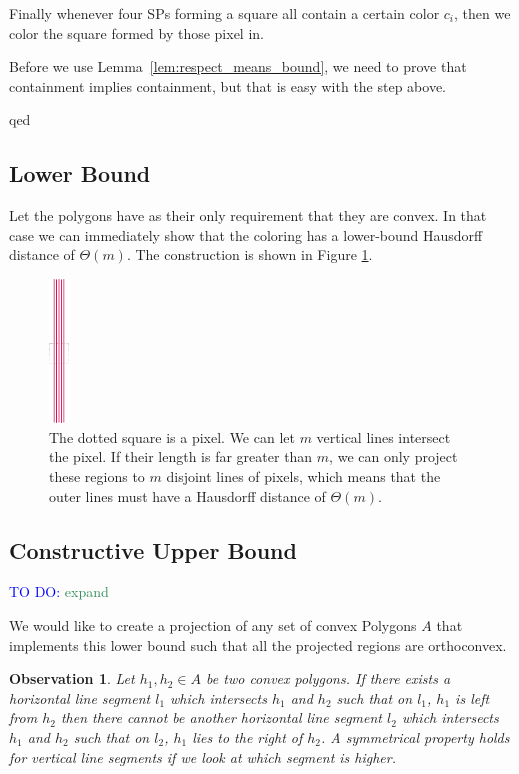 \documentclass[a4paper, UKenglish]{lipics-v2018}
\newtheorem{observation}{Observation}
\newcommand{\mremark}[3]{\textcolor{blue}{\textsc{#1 #2:}} \textcolor{SeaGreen}{\textsf{#3}}}
\newcommand{\todo}[2][DO]{\mremark{TO}{#1}{#2}}
\begin{document}
Finally whenever four SPs forming a square all contain a certain color $c_i$, then we color the square formed by those pixel in.

Before we use Lemma~\ref{lem:respect_means_bound}, we need to prove that containment implies containment, but that is easy with the step above.

qed


\subsection{Lower Bound}
\label{sub:convex_lower}

Let the polygons have as their only requirement that they are convex. In that case we can immediately show that the coloring has a lower-bound Hausdorff distance of $\Theta(m)$. The construction is shown in Figure \ref{fig:linesexample}.

\begin{figure}[H]
\centering
\includegraphics[width=20px]{Figures/linesexample.png}
\caption{The dotted square is a pixel. We can let $m$ vertical lines intersect the pixel. If their length is far greater than $m$, we can only project these regions to $m$ disjoint lines of pixels, which means that the outer lines must have a Hausdorff distance of $\Theta(m)$.}
\label{fig:linesexample}
\end{figure}



\subsection{Constructive Upper Bound}
\label{sub:convex_upper}

\todo{expand}

We would like to create a projection of any set of convex Polygons $A$ that implements this lower bound such that all the projected regions are orthoconvex.



\begin{observation}
Let $h_1,h_2 \in A$ be two convex polygons. If there exists a horizontal line segment $l_1$ which intersects $h_1$ and $h_2$ such that on $l_1$, $h_1$ is left from $h_2$ then there cannot be another horizontal line segment $l_2$ which intersects $h_1$ and $h_2$ such that on $l_2$, $h_1$ lies to the right of $h_2$. A symmetrical property holds for vertical line segments if we look at which segment is higher.
\end{observation}
\end{document}
